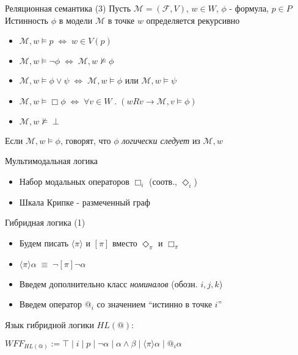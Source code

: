 \documentclass{beamer}
\begin{document}
\begin{frame}{Реляционная семантика (3)}
Пусть $\mathcal{M} = (\mathcal{F}, V)$, $w \in W$, $\phi$ - формула, $p \in P$\\
\bigskip
Истинность $\phi$ в модели $\mathcal{M}$ в точке $w$ определяется рекурсивно\\
\bigskip
\begin{itemize}
  \item $\mathcal{M}, w \models p \; \Longleftrightarrow \; w \in V(p)$
  \item $\mathcal{M}, w \models \neg \phi \; \Longleftrightarrow \; \mathcal{M}, w \not\models \phi$
  \item $\mathcal{M}, w \models \phi \vee \psi \; \Longleftrightarrow \; \mathcal{M}, w \models \phi$ или $\mathcal{M}, w \models \psi$
  \item $\mathcal{M}, w \models \Box \phi \; \Longleftrightarrow \; \forall v \in W \; . \; (w R v \to \mathcal{M}, v \models \phi)$
  \item $\mathcal{M}, w \not\models \perp$
\end{itemize}
\bigskip
Если $\mathcal{M}, w \models \phi$, говорят, что $\phi$ \textit{логически следует} из $\mathcal{M}, w$
\end{frame}

\begin{frame}{Мультимодальная логика}
\begin{itemize}
	\item Набор модальных операторов $\Box_i$ (соотв., $\Diamond_i$)
	\item Шкала Крипке - размеченный граф
\end{itemize}
\end{frame}

\begin{frame}{Гибридная логика (1)}
\begin{itemize}
	\item Будем писать $\langle \pi \rangle$ и $[\pi]$ вместо $\Diamond_\pi$ и $\Box_\pi$
	\item $\langle \pi \rangle \alpha \; \equiv \; \neg [\pi] \neg \alpha$
	\item Введем дополнительно класс \textit{номиналов} (обозн. $i, j, k$)
	\item Введем оператор $@_i$ со значением ``истинно в точке $i$''
\end{itemize}
\bigskip
Язык гибридной логики $HL(@)$:\\
\begin{center}
$WFF_{HL(@)} := \top \; \vert \; i \; \vert \; p \; \vert \; \neg \alpha \; | \; \alpha \wedge \beta \; \vert \; \langle \pi \rangle \alpha \; \vert \; @_i \alpha$
\end{center}
\end{frame}
\end{document}
